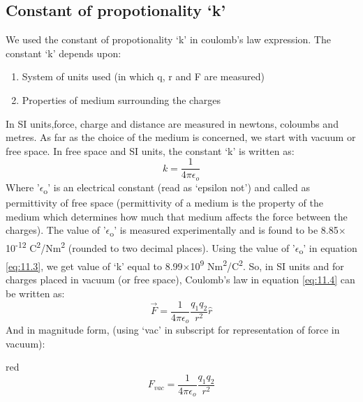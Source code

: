 \subsection*{Constant of propotionality ‘k’}
We used the constant of propotionality ‘k’ in coulomb’s law expression.
The constant ‘k’ depends upon:
\begin{enumerate}[label=(\alph*)]
\item System of units used (in which q, r and F are measured)
\item Properties of medium surrounding the charges
\end{enumerate}
In SI units,force, charge and distance are measured in newtons,
coloumbs and metres. As far as the choice of the medium is concerned,
we start with vacuum or free space. In free space and SI units,
the constant ‘k’ is written as:
\begin{equation}\label{eq:11.3}
  k = \frac{1}{4\pi\epsilon_{o}}
\end{equation}
Where '$\epsilon$\textsubscript{o}' is an electrical constant (read as ‘epsilon not’) and called
as permittivity of free space (permittivity of a medium is the property
of the medium which determines how much that medium affects the force
between the charges).
The value of '$\epsilon$\textsubscript{o}' is measured experimentally and
is found to be 8.85$\times$10\textsuperscript{-12} C\textsuperscript{2}/Nm\textsuperscript{2} (rounded to two decimal places).
Using the value of '$\epsilon$\textsubscript{o}' in equation \ref{eq:11.3}, we get value of ‘k’ equal to
8.99$\times$10\textsuperscript{9} Nm\textsuperscript{2}/C\textsuperscript{2}.
So, in SI units and for charges placed in vacuum (or free space),
Coulomb’s law in equation \ref{eq:11.4} can be written as:
\begin{equation}\label{eq:11.4}
  \vec{F} = \frac{1}{4\pi\epsilon_{o}} \frac{q_{1}q_{2}}{r^{2}} \hat{r}
\end{equation}
And in magnitude form,
(using ‘vac’ in subscript for representation of force in vacuum):
\begin{mybox}{red}{}
\begin{equation}\label{eq:11.5}
  F_{vac} = \frac{1}{4\pi\epsilon_{o}} \frac{q_{1}q_{2}}{r^{2}}
\end{equation}
\end{mybox}
